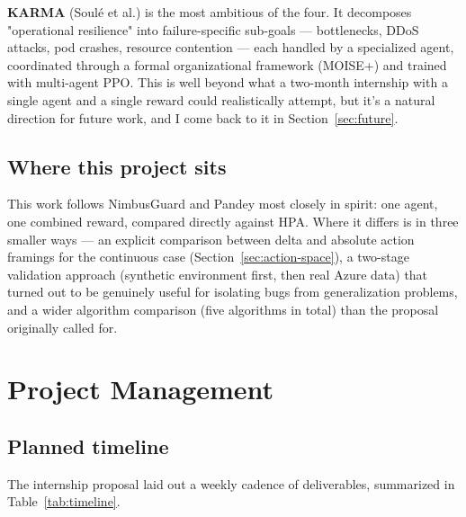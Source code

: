 \documentclass{rapportINPTCLOUD}
\begin{document}
\textbf{KARMA} (Soulé et al.) \cite{karma} is the most ambitious of the four. It decomposes "operational resilience" into failure-specific sub-goals — bottlenecks, DDoS attacks, pod crashes, resource contention — each handled by a specialized agent, coordinated through a formal organizational framework (MOISE+) and trained with multi-agent PPO. This is well beyond what a two-month internship with a single agent and a single reward could realistically attempt, but it's a natural direction for future work, and I come back to it in Section~\ref{sec:future}.

\section{Where this project sits}

This work follows NimbusGuard and Pandey most closely in spirit: one agent, one combined reward, compared directly against HPA. Where it differs is in three smaller ways — an explicit comparison between delta and absolute action framings for the continuous case (Section~\ref{sec:action-space}), a two-stage validation approach (synthetic environment first, then real Azure data) that turned out to be genuinely useful for isolating bugs from generalization problems, and a wider algorithm comparison (five algorithms in total) than the proposal originally called for.

\chapter{Project Management}
\label{chap:pm}

\section{Planned timeline}

The internship proposal laid out a weekly cadence of deliverables, summarized in Table~\ref{tab:timeline}.
\end{document}
